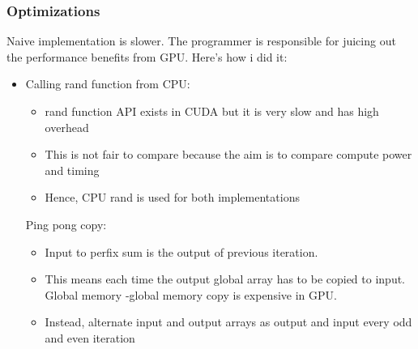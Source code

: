 \documentclass[mathserif]{beamer}
\begin{document}
\begin{frame}                                                                                                                                                                          
\frametitle{Optimizations}
Naive implementation is slower. The programmer is responsible for juicing out the performance benefits from GPU. Here's how i did it:
\begin{itemize}
\item Calling rand function from CPU: 
\begin{itemize}
\item rand function API exists in CUDA but it is very slow and has high overhead
\item This is not fair to compare because the aim is to compare compute power and timing
\item Hence, CPU rand is used for both implementations 
\end{itemize}
Ping pong copy: 
\begin{itemize}
\item Input to perfix sum is the output of previous iteration.  
\item This means each time the output global array has to be copied to input. Global memory -global memory copy is expensive in GPU.  
\item Instead, alternate input and output arrays as output and input every odd and even iteration 
\end{itemize}
\end{itemize}
\end{frame}              
\end{document}
